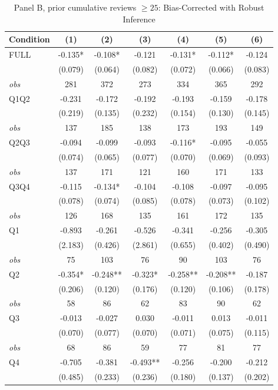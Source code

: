 \begin{table}[!htbp]
\centering
\caption{Panel B, prior cumulative reviews $\geq25$: Bias-Corrected with Robust Inference}
\begin{tabular}{lcccccc}
\toprule
Condition & (1) & (2) & (3) & (4) & (5) & (6) \\
\midrule
FULL & -0.135* & -0.108* & -0.121 & -0.131* & -0.112* & -0.124 \\
 & (0.079) & (0.064) & (0.082) & (0.072) & (0.066) & (0.083) \\
\textit{obs} & 281 & 372 & 273 & 334 & 365 & 292 \\
Q1Q2 & -0.231 & -0.172 & -0.192 & -0.193 & -0.159 & -0.178 \\
 & (0.219) & (0.135) & (0.232) & (0.154) & (0.130) & (0.145) \\
\textit{obs} & 137 & 185 & 138 & 173 & 193 & 149 \\
Q2Q3 & -0.094 & -0.099 & -0.093 & -0.116* & -0.095 & -0.055 \\
 & (0.074) & (0.065) & (0.077) & (0.070) & (0.069) & (0.093) \\
\textit{obs} & 137 & 171 & 121 & 160 & 171 & 133 \\
Q3Q4 & -0.115 & -0.134* & -0.104 & -0.108 & -0.097 & -0.095 \\
 & (0.078) & (0.074) & (0.085) & (0.078) & (0.073) & (0.102) \\
\textit{obs} & 126 & 168 & 135 & 161 & 172 & 135 \\
Q1 & -0.893 & -0.261 & -0.526 & -0.341 & -0.256 & -0.305 \\
 & (2.183) & (0.426) & (2.861) & (0.655) & (0.402) & (0.490) \\
\textit{obs} & 75 & 103 & 76 & 90 & 103 & 76 \\
Q2 & -0.354* & -0.248** & -0.323* & -0.258** & -0.208** & -0.187 \\
 & (0.206) & (0.120) & (0.176) & (0.120) & (0.106) & (0.178) \\
\textit{obs} & 58 & 86 & 62 & 83 & 90 & 62 \\
Q3 & -0.013 & -0.027 & 0.030 & -0.011 & 0.013 & -0.011 \\
 & (0.070) & (0.077) & (0.070) & (0.071) & (0.075) & (0.115) \\
\textit{obs} & 68 & 86 & 59 & 77 & 81 & 77 \\
Q4 & -0.705 & -0.381 & -0.493** & -0.256 & -0.200 & -0.212 \\
 & (0.485) & (0.233) & (0.236) & (0.180) & (0.137) & (0.202) \\

\end{tabular}
\end{table}
